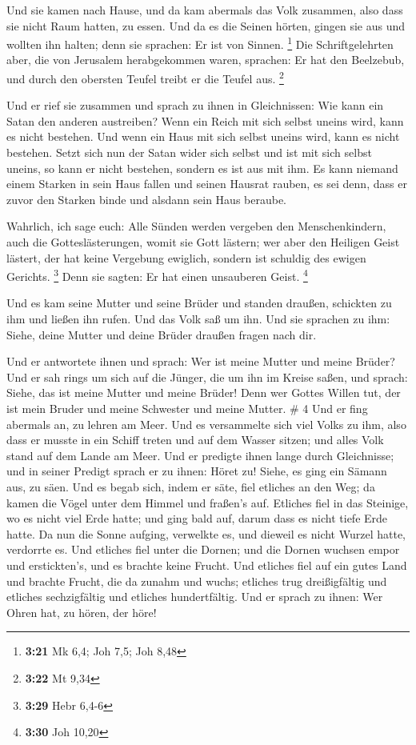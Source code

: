  Und sie kamen nach Hause, und da kam abermals das Volk
zusammen, also dass sie nicht Raum hatten, zu essen.  Und
da es die Seinen hörten, gingen sie aus und wollten ihn halten; denn sie
sprachen: Er ist von Sinnen. \footnote{\textbf{3:21} Mk 6,4; Joh 7,5;
  Joh 8,48}  Die Schriftgelehrten aber, die von Jerusalem
herabgekommen waren, sprachen: Er hat den Beelzebub, und durch den
obersten Teufel treibt er die Teufel aus. \footnote{\textbf{3:22} Mt
  9,34}

 Und er rief sie zusammen und sprach zu ihnen in
Gleichnissen: Wie kann ein Satan den anderen austreiben? 
Wenn ein Reich mit sich selbst uneins wird, kann es nicht bestehen.
 Und wenn ein Haus mit sich selbst uneins wird, kann es
nicht bestehen.  Setzt sich nun der Satan wider sich selbst
und ist mit sich selbst uneins, so kann er nicht bestehen, sondern es
ist aus mit ihm.  Es kann niemand einem Starken in sein
Haus fallen und seinen Hausrat rauben, es sei denn, dass er zuvor den
Starken binde und alsdann sein Haus beraube.

 Wahrlich, ich sage euch: Alle Sünden werden vergeben den
Menschenkindern, auch die Gotteslästerungen, womit sie Gott lästern;
 wer aber den Heiligen Geist lästert, der hat keine
Vergebung ewiglich, sondern ist schuldig des ewigen Gerichts.
\footnote{\textbf{3:29} Hebr 6,4-6}  Denn sie sagten: Er
hat einen unsauberen Geist. \footnote{\textbf{3:30} Joh 10,20}

 Und es kam seine Mutter und seine Brüder und standen
draußen, schickten zu ihm und ließen ihn rufen.  Und das
Volk saß um ihn. Und sie sprachen zu ihm: Siehe, deine Mutter und deine
Brüder draußen fragen nach dir.

 Und er antwortete ihnen und sprach: Wer ist meine Mutter
und meine Brüder?  Und er sah rings um sich auf die Jünger,
die um ihn im Kreise saßen, und sprach: Siehe, das ist meine Mutter und
meine Brüder!  Denn wer Gottes Willen tut, der ist mein
Bruder und meine Schwester und meine Mutter. \# 4  Und er
fing abermals an, zu lehren am Meer. Und es versammelte sich viel Volks
zu ihm, also dass er musste in ein Schiff treten und auf dem Wasser
sitzen; und alles Volk stand auf dem Lande am Meer.  Und er
predigte ihnen lange durch Gleichnisse; und in seiner Predigt sprach er
zu ihnen:  Höret zu! Siehe, es ging ein Sämann aus, zu säen.
 Und es begab sich, indem er säte, fiel etliches an den Weg;
da kamen die Vögel unter dem Himmel und fraßen's auf. 
Etliches fiel in das Steinige, wo es nicht viel Erde hatte; und ging
bald auf, darum dass es nicht tiefe Erde hatte.  Da nun die
Sonne aufging, verwelkte es, und dieweil es nicht Wurzel hatte,
verdorrte es.  Und etliches fiel unter die Dornen; und die
Dornen wuchsen empor und erstickten's, und es brachte keine Frucht.
 Und etliches fiel auf ein gutes Land und brachte Frucht,
die da zunahm und wuchs; etliches trug dreißigfältig und etliches
sechzigfältig und etliches hundertfältig.  Und er sprach zu
ihnen: Wer Ohren hat, zu hören, der höre!

